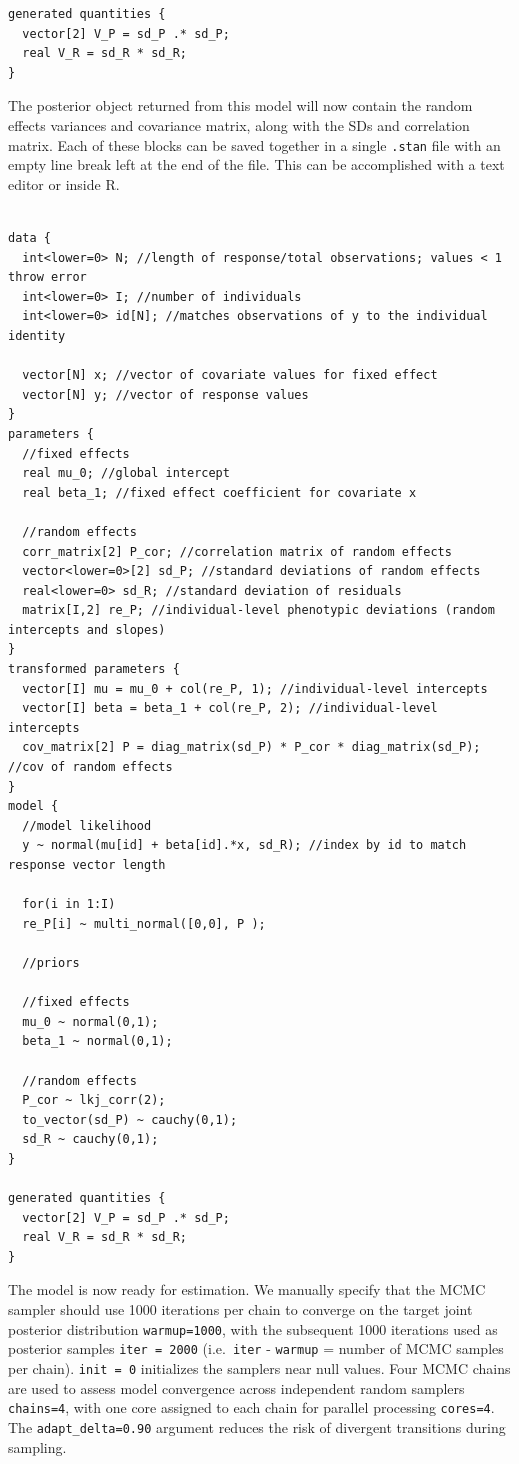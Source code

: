 \documentclass[
]{book}
\begin{document}
\begin{verbatim}
generated quantities {
  vector[2] V_P = sd_P .* sd_P;
  real V_R = sd_R * sd_R;
}
\end{verbatim}

The posterior object returned from this model will now contain the random effects variances and covariance matrix, along with the SDs and correlation matrix. Each of these blocks can be saved together in a single \texttt{.stan} file with an empty line break left at the end of the file. This can be accomplished with a text editor or inside R.

\begin{verbatim}

data {
  int<lower=0> N; //length of response/total observations; values < 1 throw error
  int<lower=0> I; //number of individuals
  int<lower=0> id[N]; //matches observations of y to the individual identity 

  vector[N] x; //vector of covariate values for fixed effect
  vector[N] y; //vector of response values
}
parameters {
  //fixed effects
  real mu_0; //global intercept
  real beta_1; //fixed effect coefficient for covariate x

  //random effects
  corr_matrix[2] P_cor; //correlation matrix of random effects 
  vector<lower=0>[2] sd_P; //standard deviations of random effects
  real<lower=0> sd_R; //standard deviation of residuals
  matrix[I,2] re_P; //individual-level phenotypic deviations (random intercepts and slopes)
}
transformed parameters {
  vector[I] mu = mu_0 + col(re_P, 1); //individual-level intercepts
  vector[I] beta = beta_1 + col(re_P, 2); //individual-level intercepts
  cov_matrix[2] P = diag_matrix(sd_P) * P_cor * diag_matrix(sd_P); //cov of random effects
}
model {
  //model likelihood
  y ~ normal(mu[id] + beta[id].*x, sd_R); //index by id to match response vector length
  
  for(i in 1:I)
  re_P[i] ~ multi_normal([0,0], P );
  
  //priors
  
  //fixed effects
  mu_0 ~ normal(0,1);
  beta_1 ~ normal(0,1);
  
  //random effects
  P_cor ~ lkj_corr(2);
  to_vector(sd_P) ~ cauchy(0,1);
  sd_R ~ cauchy(0,1);
}

generated quantities {
  vector[2] V_P = sd_P .* sd_P;
  real V_R = sd_R * sd_R;
}
\end{verbatim}

The model is now ready for estimation. We manually specify that the MCMC sampler should use 1000 iterations per chain to converge on the target joint posterior distribution \texttt{warmup=1000}, with the subsequent 1000 iterations used as posterior samples \texttt{iter\ =\ 2000} (i.e.~\texttt{iter} - \texttt{warmup} = number of MCMC samples per chain). \texttt{init\ =\ 0} initializes the samplers near null values. Four MCMC chains are used to assess model convergence across independent random samplers \texttt{chains=4}, with one core assigned to each chain for parallel processing \texttt{cores=4}. The \texttt{adapt\_delta=0.90} argument reduces the risk of divergent transitions during sampling.
\end{document}
